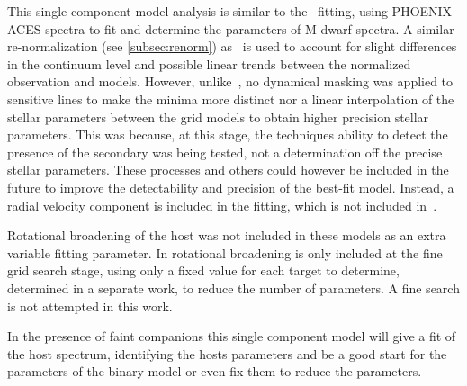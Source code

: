 This single component model analysis is similar to the~\citet{passegger_fundamental_2016} \textchisquared{} fitting, using {PHOENIX-ACES} spectra to fit and determine the parameters of {M-dwarf} spectra.
A similar re-normalization (see \cref{subsec:renorm}) as~\citet{passegger_fundamental_2016} is used to account for slight differences in the continuum level and possible linear trends between the normalized observation and models.
However, unlike~\citet{passegger_fundamental_2016}, no dynamical masking was applied to sensitive lines to make the \textchisquared{} minima more distinct nor a linear interpolation of the stellar parameters between the grid models to obtain higher precision stellar parameters.
This was because, at this stage, the techniques ability to detect the presence of the secondary was being tested, not a determination off the precise stellar parameters.
These processes and others could however be included in the future to improve the detectability and precision of the best-fit model.
Instead, a radial velocity component is included in the \textchisquared{} fitting, which is not included in~\citet{passegger_fundamental_2016}.

{\red Rotational broadening of the host was not included in these models as an extra variable fitting  parameter.
In \citet{passegger_carmenes_2018} rotational broadening is only included at the fine grid search stage, using only a fixed value for each target to determine, determined in a separate work, to reduce the number of parameters.
A fine search is not attempted in this work.}

In the presence of faint companions this single component model will give a fit of the host spectrum, identifying the hosts parameters and be a good start for the parameters of the binary model or even fix them to reduce the parameters.

